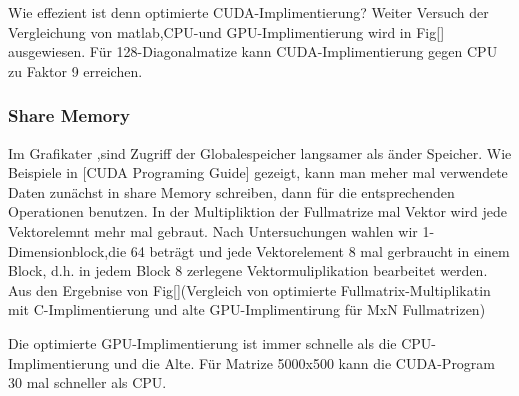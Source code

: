 
Wie effezient ist denn optimierte CUDA-Implimentierung? 
Weiter Versuch der Vergleichung von matlab,CPU-und GPU-Implimentierung wird in Fig[] ausgewiesen. Für 128-Diagonalmatize kann CUDA-Implimentierung gegen CPU zu Faktor 9 erreichen.

\subsubsection{Share Memory}
Im Grafikater ,sind Zugriff der Globalespeicher  langsamer als änder Speicher.  Wie Beispiele in [CUDA Programing Guide] gezeigt, kann man meher mal verwendete Daten zunächst in share Memory schreiben, dann für die entsprechenden Operationen benutzen. In der Multipliktion der Fullmatrize mal Vektor wird jede Vektorelemnt mehr mal gebraut. Nach Untersuchungen wahlen wir 1-Dimensionblock,die 64 beträgt und jede Vektorelement 8 mal gerbraucht in einem Block, d.h. in jedem Block 8 zerlegene Vektormuliplikation bearbeitet werden. Aus den Ergebnise von Fig[](Vergleich von optimierte Fullmatrix-Multiplikatin mit C-Implimentierung und alte GPU-Implimentirung für MxN Fullmatrizen) 


Die optimierte GPU-Implimentierung ist immer schnelle als die CPU-Implimentierung  und die Alte. Für Matrize 5000x500 kann die CUDA-Program 30 mal schneller als CPU.